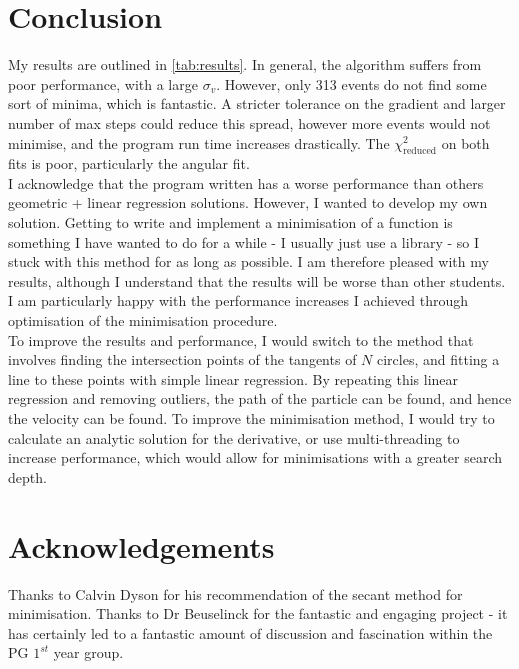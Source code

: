 \documentclass[11pt]{article}
\begin{document}
\section{Conclusion}
\label{sec:conclusion}
My results are outlined in \autoref{tab:results}. In general, the algorithm suffers from poor performance, with a large $\sigma_v$.  However, only 313 events do not find some sort of minima, which is fantastic. A stricter tolerance on the gradient and larger number of max steps could reduce this spread, however more events would not minimise, and the program run time increases drastically. The $\chi^2_\text{reduced}$ on both fits is poor, particularly the angular fit.\\

I acknowledge that the program written has a worse performance than others geometric + linear regression solutions. However, I wanted to develop my own solution. Getting to write and implement a minimisation of a function is something I have wanted to do for a while - I usually just use a library - so I stuck with this method for as long as possible. I am therefore pleased with my results, although I understand that the results will be worse than other students. I am particularly happy with the performance increases I achieved through optimisation of the minimisation procedure.\\

To improve the results and performance, I would switch to the method that involves finding the intersection points of the tangents of $N$ circles, and fitting a line to these points with simple linear regression. By repeating this linear regression and removing outliers, the path of the particle can be found, and hence the velocity can be found. To improve the minimisation method, I would try to calculate an analytic solution for the derivative, or use multi-threading to increase performance, which would allow for minimisations with a greater search depth.

\section{Acknowledgements}
\label{sec:acknowledgements}
Thanks to Calvin Dyson for his recommendation of the secant method for minimisation. Thanks to Dr Beuselinck for the fantastic and engaging project - it has certainly led to a fantastic amount of discussion and fascination within the PG $1^{st}$ year group.


\printbibliography
\end{document}
